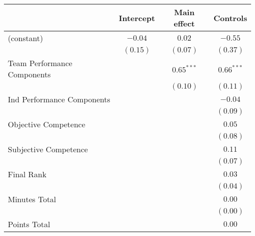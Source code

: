 
\begin{table}
\begin{center}
\begin{tabular}{l c c c }
\toprule
 & Intercept & Main effect & Controls \\
\midrule
(constant)                                                & $-0.04$  & $0.02$                & $-0.55$               \\
                                                          & $(0.15)$ & $(0.07)$              & $(0.37)$              \\
Team Performance Components                               &          & $\mathbf{0.65}^{***}$ & $\mathbf{0.66}^{***}$ \\
                                                          &          & $(0.10)$              & $(0.11)$              \\
Ind Performance Components                                &          &                       & $-0.04$               \\
                                                          &          &                       & $(0.09)$              \\
Objective Competence                                      &          &                       & $0.05$                \\
                                                          &          &                       & $(0.08)$              \\
Subjective Competence                                     &          &                       & $0.11$                \\
                                                          &          &                       & $(0.07)$              \\
Final Rank                                                &          &                       & $0.03$                \\
                                                          &          &                       & $(0.04)$              \\
Minutes Total                                             &          &                       & $0.00$                \\
                                                          &          &                       & $(0.00)$              \\
Points Total                                              &          &                       & $0.00$                \\

\end{tabular}
\end{center}
\end{table}
